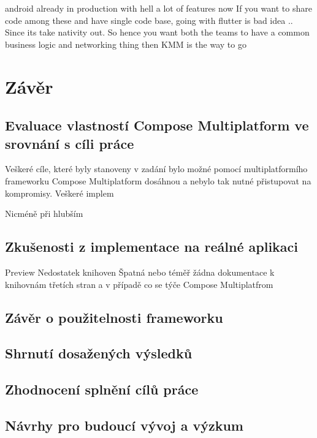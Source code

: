 android already in production with hell a lot of features now If you want to share code among these and have single code base, going with flutter is bad idea .. Since its take nativity out. So hence you want both the teams to have a common business logic and networking thing then KMM is the way to go 

\chapter{Závěr}

\section{Evaluace vlastností Compose Multiplatform ve srovnání s cíli práce}
Veškeré cíle, které byly stanoveny v zadání bylo možné pomocí multiplatformího frameworku Compose Multiplatform dosáhnou a nebylo tak
nutné přistupovat na kompromisy. Veškeré implem

Nicméně při hlubším 


\section{Zkušenosti z implementace na reálné aplikaci}
Preview
Nedostatek knihoven
Špatná nebo téměř žádna dokumentace k knihovnám třetích stran a v případě co se týče Compose Multiplatfrom
\section{Závěr o použitelnosti frameworku}

\section{Shrnutí dosažených výsledků}
\section{Zhodnocení splnění cílů práce}
\section{Návrhy pro budoucí vývoj a výzkum}


